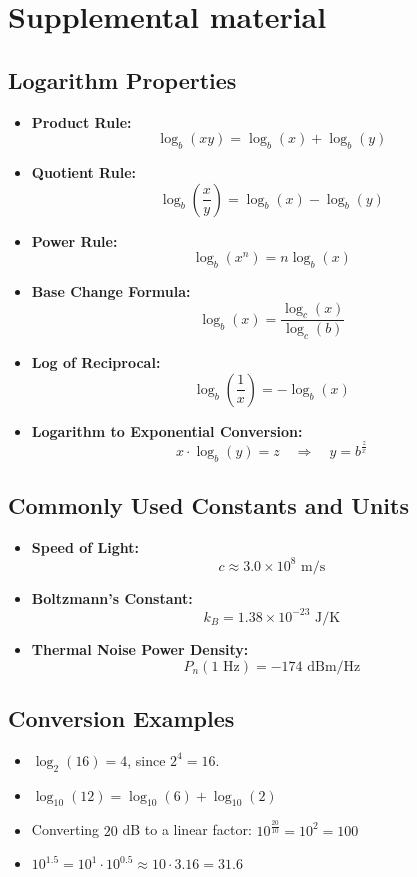 \newpage
\section{Supplemental material}
\subsection{Logarithm Properties}
\begin{itemize}
    \item \textbf{Product Rule:} 
    \[
    \log_b (xy) = \log_b (x) + \log_b (y)
    \]
    \item \textbf{Quotient Rule:} 
    \[
    \log_b \left( \frac{x}{y} \right) = \log_b (x) - \log_b (y)
    \]
    \item \textbf{Power Rule:} 
    \[
    \log_b (x^n) = n \log_b (x)
    \]
    \item \textbf{Base Change Formula:} 
    \[
    \log_b (x) = \frac{\log_c (x)}{\log_c (b)}
    \]
    \item \textbf{Log of Reciprocal:} 
    \[
    \log_b \left( \frac{1}{x} \right) = -\log_b (x)
    \]
    \item \textbf{Logarithm to Exponential Conversion:}
    \[
    x \cdot \log_b(y) = z \quad \Rightarrow \quad y = b^{\frac{z}{x}}
    \]
\end{itemize}
\subsection{Commonly Used Constants and Units}

\begin{itemize}
    \item \textbf{Speed of Light:} 
    \[
    c \approx 3.0 \times 10^8 \text{ m/s}
    \]
    \item \textbf{Boltzmann's Constant:} 
    \[
    k_B = 1.38 \times 10^{-23} \text{ J/K}
    \]
        \item \textbf{Thermal Noise Power Density:}  
    \[
    P_n (1 \text{ Hz}) = -174 \text{ dBm/Hz}
    \]
    
\end{itemize}

\subsection{Conversion Examples}
\begin{itemize}
    \item \(\log_{2} (16) = 4\), since \(2^4 = 16\).
    \item \(\log_{10}(12) = \log_{10}(6)+\log_{10}(2)\)
    \item Converting \( 20 \) dB to a linear factor: \(10^{\frac{20}{10}} = 10^{2} = 100\)
    \item \(10^{1.5} = 10^1 \cdot 10^{0.5} \approx 10 \cdot 3.16 = 31.6\)

\end{itemize}

